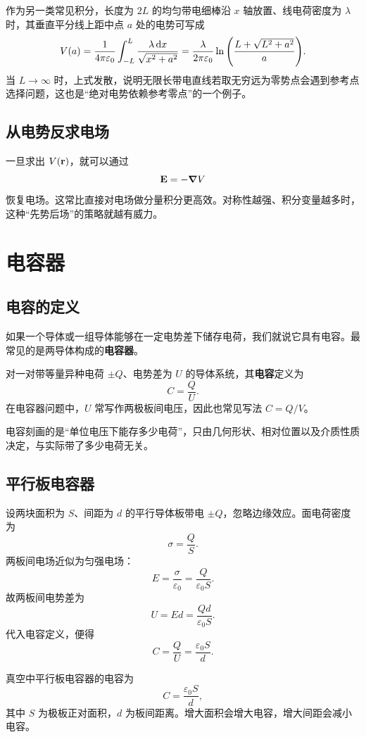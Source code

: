 作为另一类常见积分，长度为 $2L$ 的均匀带电细棒沿 $x$ 轴放置、线电荷密度为 $\lambda$ 时，其垂直平分线上距中点 $a$ 处的电势可写成
\[
V(a)=\frac{1}{4\pi\varepsilon_0}\int_{-L}^{L}\frac{\lambda\,\dd x}{\sqrt{x^2+a^2}}
=\frac{\lambda}{2\pi\varepsilon_0}\ln\qty(\frac{L+\sqrt{L^2+a^2}}{a}).
\]
当 $L\to \infty$ 时，上式发散，说明无限长带电直线若取无穷远为零势点会遇到参考点选择问题，这也是“绝对电势依赖参考零点”的一个例子。

\subsection{从电势反求电场}

一旦求出 $V(\vb r)$，就可以通过
\[
\vb E=-\grad V
\]
恢复电场。这常比直接对电场做分量积分更高效。对称性越强、积分变量越多时，这种“先势后场”的策略就越有威力。

\section{电容器}

\subsection{电容的定义}

如果一个导体或一组导体能够在一定电势差下储存电荷，我们就说它具有电容。最常见的是两导体构成的\textbf{电容器}。

\begin{definition}
对一对带等量异种电荷 $\pm Q$、电势差为 $U$ 的导体系统，其\textbf{电容}定义为
\[
C=\frac{Q}{U}.
\]
在电容器问题中，$U$ 常写作两极板间电压，因此也常见写法 $C=Q/V$。
\end{definition}

电容刻画的是“单位电压下能存多少电荷”，只由几何形状、相对位置以及介质性质决定，与实际带了多少电荷无关。

\subsection{平行板电容器}

设两块面积为 $S$、间距为 $d$ 的平行导体板带电 $\pm Q$，忽略边缘效应。面电荷密度为
\[
\sigma=\frac{Q}{S}.
\]
两板间电场近似为匀强电场：
\[
E=\frac{\sigma}{\varepsilon_0}=\frac{Q}{\varepsilon_0 S}.
\]
故两板间电势差为
\[
U=Ed=\frac{Qd}{\varepsilon_0 S}.
\]
代入电容定义，便得
\[
C=\frac{Q}{U}=\frac{\varepsilon_0 S}{d}.
\]

\begin{law}
真空中平行板电容器的电容为
\[
C=\frac{\varepsilon_0 S}{d},
\]
其中 $S$ 为极板正对面积，$d$ 为板间距离。增大面积会增大电容，增大间距会减小电容。
\end{law}

